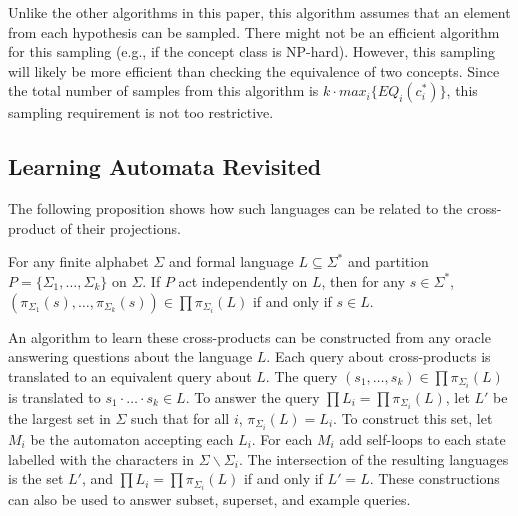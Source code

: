 Unlike the other algorithms in this paper, this algorithm assumes that an element from each hypothesis can be sampled. 
There might not be an efficient algorithm for this sampling (e.g., if the concept class is NP-hard).
However, this sampling will likely be more efficient than checking the equivalence of two concepts. 
Since the total number of samples from this algorithm is $k \cdot max_i\{ EQ_i(c^*_i) \}$, this sampling requirement is not too restrictive.


\subsection{Learning Automata Revisited}
The following proposition shows how such languages can be related to the cross-product of their projections.

\begin{proposition}
For any finite alphabet $\Sigma$ and formal language $L \subseteq \Sigma^*$  and partition $P = \{ \Sigma_1, \dots, \Sigma_k\}$ on $\Sigma$. 
If $P$ act independently on $L$, then for any $s \in \Sigma^*$, $(\pi_{\Sigma_1}(s), \dots, \pi_{\Sigma_k}(s)) \in \prod \pi_{\Sigma_i}(L)$ if and only if $s \in L$.
\end{proposition}


An algorithm to learn these cross-products can be constructed from any oracle answering questions about the language $L$.
Each query about cross-products is translated to an equivalent query about $L$.
The query $(s_1,\dots, s_k) \in \prod \pi_{\Sigma_i}(L)$ is translated to $s_1 \cdot \dots \cdot s_k \in L$. 
To answer the query  $\prod L_i = \prod \pi_{\Sigma_i}(L)$, let $L'$ be the largest set in $\Sigma$ such that for all $i$, $\pi_{\Sigma_i}(L) = L_i$.
To construct this set, let $M_i$ be the automaton accepting each $L_i$. 
For each $M_i$ add self-loops to each state labelled with the characters in $\Sigma \backslash \Sigma_i$.
The intersection of the resulting languages is the set $L'$, and $\prod L_i = \prod \pi_{\Sigma_i}(L)$ if and only if $L' = L$. 
These constructions can also be used to answer subset, superset, and example queries. 


